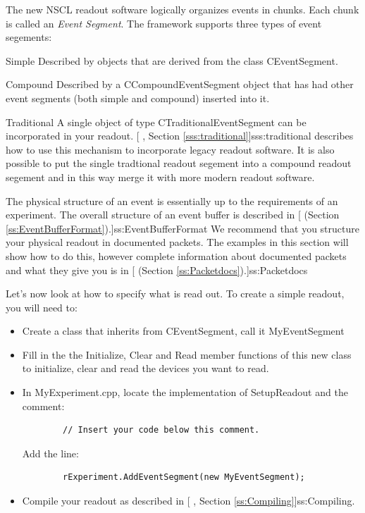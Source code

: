       The new NSCL readout software logically 
      organizes events in chunks. 
      Each chunk is
      called an {\em Event Segment}.  The framework supports three
      types of event segements:
      \begin{description}
	 \item{Simple}  Described by objects that are
	    derived from the class CEventSegment.
	 \item{Compound} Described by a CCompoundEventSegment
	    object that has had other event segments (both simple
	    and compound) inserted into it.
	 \item{Traditional}  A single object of type 
	    CTraditionalEventSegment can be incorporated in your
	    readout.  
	    [
	    , Section \ref{sss:traditional}]{sss:traditional} 
	    describes how to use this mechanism to incorporate
	    legacy readout software.  It is also possible to
	    put the single tradtional readout segement into
	    a compound readout segement and in this way merge it
	    with more modern readout software.
      \end{description}
      
   The physical structure of an event is essentially up to the
   requirements of an experiment.  The overall structure of
   an event buffer is described in [
      (Section \ref{ss:EventBufferFormat}).]{ss:EventBufferFormat}
   We recommend that you structure your physical readout in 
   documented packets.  The examples in this section will show
   how to do this, however complete information about documented
   packets and what they give you is in 
   [ (Section
      \ref{ss:Packetdocs}).]{ss:Packetdocs}

   Let's now look at how to specify what is read out.  To
   create a simple readout, you will need to:
   \begin{itemize}
      \item Create a class that inherits from CEventSegment, call it
		MyEventSegment
      \item Fill in the the Initialize, Clear and Read member functions of
		this new class to initialize, clear and read the devices you
		want to read.
      \item In MyExperiment.cpp, locate the implementation of 
		SetupReadout and the comment:
		\begin{verbatim}
		// Insert your code below this comment.
		\end{verbatim}
		Add the line:
		\begin{verbatim}
		rExperiment.AddEventSegment(new MyEventSegment);
		\end{verbatim}
      \item Compile your readout as described in 
		[
		, Section \ref{ss:Compiling}]{ss:Compiling}.
   \end{itemize}



